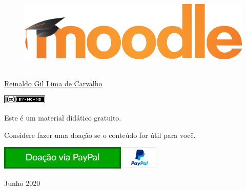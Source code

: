 \thispagestyle{empty}

\begin{center}
  \begin{figure}[H]
    \begin{center}
      \hspace{-1cm}
      \includegraphics[width=0.55\columnwidth]{titlepage}
  ~\cite{FrontPageIMG}
    \end{center}      
  \end{figure}

  \vskip 2cm

  \hspace{-1cm}
  \begin{minipage}[c]{17cm}
    \begin{center}

{\huge {}\vskip 0.15cm %

{\large \href{http://reinaldoc.wordpress.com}{Reinaldo Gil Lima de Carvalho}} %

{\includegraphics[width=0.1\columnwidth]{imgs/license-CC-BY-NC-ND_header.png}}

\vskip 7cm

{\large {Este é um material didático gratuito.}}

\vskip 0.15cm

{\large {Considere fazer uma doação se o conteúdo for útil para você.}}

\vskip 1cm

\href{https://www.paypal.com/cgi-bin/webscr?cmd=_s-xclick&hosted_button_id=9S2QRNKE3WKM6}{
    {\includegraphics[width=0.4\columnwidth]{imgs/donate.jpg}}
  }
}
    \end{center}
  \end{minipage}

  \vskip 3cm

  {\huge Junho 2020} %
\end{center}
